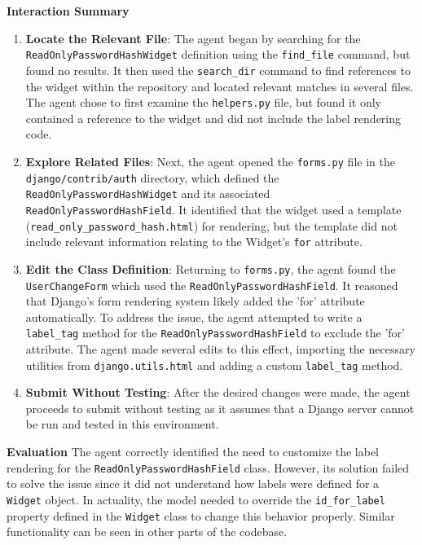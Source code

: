 \textbf{Interaction Summary}
\begin{enumerate}
    \item \textbf{Locate the Relevant File}:
    The agent began by searching for the \texttt{ReadOnlyPasswordHashWidget} definition using the \texttt{find\_file} command, but found no results.
    It then used the \texttt{search\_dir} command to find references to the widget within the repository and located relevant matches in several files.
    The agent chose to first examine the \texttt{helpers.py} file, but found it only contained a reference to the widget and did not include the label rendering code.

    \item \textbf{Explore Related Files}:
    Next, the agent opened the \texttt{forms.py} file in the \texttt{django/contrib/auth} directory, which defined the \texttt{ReadOnlyPasswordHashWidget} and its associated \texttt{ReadOnlyPasswordHashField}.
    It identified that the widget used a template (\texttt{read\_only\_password\_hash.html}) for rendering, but the template did not include relevant information relating to the Widget's \texttt{for} attribute.

    \item \textbf{Edit the Class Definition}:
    Returning to \texttt{forms.py}, the agent found the \texttt{UserChangeForm} which used the \texttt{ReadOnlyPasswordHashField}.
    It reasoned that Django's form rendering system likely added the 'for' attribute automatically.
    To address the issue, the agent attempted to write a \texttt{label\_tag} method for the \texttt{ReadOnlyPasswordHashField} to exclude the 'for' attribute.
    The agent made several edits to this effect, importing the necessary utilities from \texttt{django.utils.html} and adding a custom \texttt{label\_tag} method.

    \item \textbf{Submit Without Testing}:
    After the desired changes were made, the agent proceeds to submit without testing as it assumes that a Django server cannot be run and tested in this environment.
\end{enumerate}

\textbf{Evaluation}
The agent correctly identified the need to customize the label rendering for the \texttt{ReadOnlyPasswordHashField} class.
However, its solution failed to solve the issue since it did not understand how labels were defined for a \texttt{Widget} object.
In actuality, the model needed to override the \texttt{id\_for\_label} property defined in the \texttt{Widget} class to change this behavior properly.
Similar functionality can be seen in other parts of the codebase.


